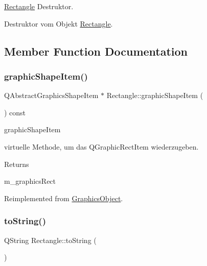 \hyperlink{class_rectangle}{Rectangle} Destruktor. 

Destruktor vom Objekt \hyperlink{class_rectangle}{Rectangle}. 

\subsection{Member Function Documentation}
\mbox{\label{class_rectangle_aeafbe16d72e37bb155c78a122408d3dc}} 
\subsubsection{\texorpdfstring{graphic\+Shape\+Item()}{graphicShapeItem()}}
{\footnotesize\ttfamily Q\+Abstract\+Graphics\+Shape\+Item $\ast$ Rectangle\+::graphic\+Shape\+Item (\begin{DoxyParamCaption}{ }\end{DoxyParamCaption}) const\hspace{0.3cm}{\ttfamily [virtual]}}



graphic\+Shape\+Item 

virtuelle Methode, um das Q\+Graphic\+Rect\+Item wiederzugeben.

\begin{DoxyReturn}{Returns}


m\+\_\+graphics\+Rect 
\end{DoxyReturn}


Reimplemented from \hyperlink{class_graphics_object_ad898be2fdbcc4c57f908cdd6a3feaa44}{Graphics\+Object}.

\mbox{\label{class_rectangle_a75b1e77ef828ff8de86cfcf6b03bfadb}} 
\subsubsection{\texorpdfstring{to\+String()}{toString()}}
{\footnotesize\ttfamily Q\+String Rectangle\+::to\+String (\begin{DoxyParamCaption}{ }\end{DoxyParamCaption})\hspace{0.3cm}{\ttfamily [virtual]}}



